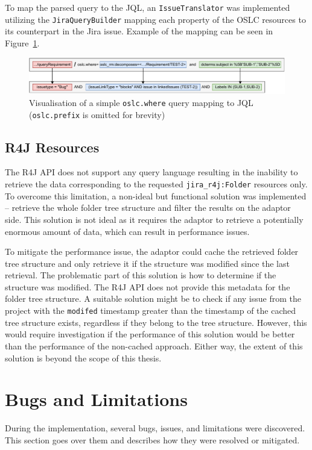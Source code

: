 To map the parsed query to the JQL, an \texttt{IssueTranslator} was implemented utilizing the \texttt{JiraQueryBuilder} mapping each property of the OSLC resources to its counterpart in the Jira issue. Example of the mapping can be seen in Figure \ref{fig:jql_visual}.

\begin{figure}[H]
  \centering
  \includegraphics[width=1\linewidth]{figures/jql-visual.pdf}
  \caption{Visualisation of a simple \texttt{oslc.where} query mapping to JQL (\texttt{oslc.prefix} is omitted for brevity)}
  \label{fig:jql_visual}
\end{figure}

\subsection*{R4J Resources}
\label{sec:r4j_query}
The R4J API does not support any query language resulting in the inability to retrieve the data corresponding to the requested \texttt{jira\_r4j:Folder} resources only. To overcome this limitation, a non-ideal but functional solution was implemented -- retrieve the whole folder tree structure and filter the results on the adaptor side. This solution is not ideal as it requires the adaptor to retrieve a potentially enormous amount of data, which can result in performance issues.

To mitigate the performance issue, the adaptor could cache the retrieved folder tree structure and only retrieve it if the structure was modified since the last retrieval. The problematic part of this solution is how to determine if the structure was modified. The R4J API does not provide this metadata for the folder tree structure. A suitable solution might be to check if any issue from the project with the \texttt{modifed} timestamp greater than the timestamp of the cached tree structure exists, regardless if they belong to the tree structure. However, this would require investigation if the performance of this solution would be better than the performance of the non-cached approach. Either way, the extent of this solution is beyond the scope of this thesis.

\section{Bugs and Limitations}
During the implementation, several bugs, issues, and limitations were discovered. This section goes over them and describes how they were resolved or mitigated.


